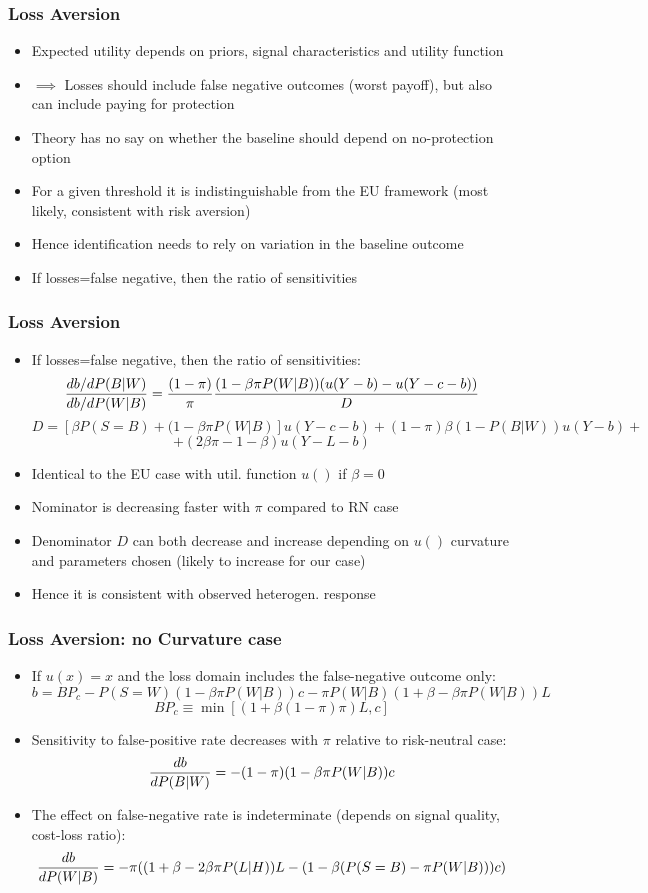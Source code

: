 \documentclass[11pt,hyperref={bookmarks=false}]{beamer}
\begin{document}
\begin{frame}
\frametitle{Loss Aversion}
\begin{itemize}
\item Expected utility depends on priors, signal characteristics and utility function
\item $\implies$ Losses should include false negative outcomes (worst payoff), but also can include paying for protection
\item Theory has no say on whether the baseline should depend on no-protection option
\item For a given threshold it is indistinguishable from the EU framework (most likely, consistent with risk aversion)
\item Hence identification needs to rely on variation in the baseline outcome
\item If losses=false negative, then the ratio of sensitivities
\end{itemize}
\end{frame}





\begin{frame}
\frametitle{Loss Aversion}
\begin{itemize}
\item If losses=false negative, then the ratio of sensitivities:
\footnotesize
$${db/dP(B|W)\over db/dP(W|B)}={(1-\pi)\over \pi}{(1-\beta \pi P(W|B))(u(Y-b)-u(Y-c-b))\over D}$$
$$D=[\beta P(S=B)+(1-\beta \pi P(W|B)]u(Y-c-b)+(1-\pi)\beta(1-P(B|W))u(Y-b)+$$
$$+(2\beta \pi-1-\beta) u(Y-L-b)$$
\normalsize
\item Identical to the EU case with util. function $u()$ if $\beta=0$
\item Nominator is decreasing faster with $\pi$ compared to RN case
\item Denominator $D$ can both decrease and increase depending on $u()$ curvature and parameters chosen (likely to increase for our case)
\item Hence it is consistent with observed heterogen. response
\end{itemize}
\end{frame}


\begin{frame}
\frametitle{Loss Aversion: no Curvature case}
\begin{itemize}
\item If $u(x)=x$ and the loss domain includes the false-negative outcome only:
\small
$$b=BP_c - P(S=W)(1-\beta \pi P(W|B))c-\pi P(W|B)(1+\beta-\beta \pi P(W|B))L$$
$$BP_c \equiv \min[(1+\beta(1-\pi)\pi) L, c]$$
\normalsize
\item Sensitivity to false-positive rate decreases with $\pi$ relative to risk-neutral case:
\small
$${db \over dP(B|W)}=-(1-\pi)(1-\beta \pi P(W|B))c$$
\normalsize
\item The effect on false-negative rate is indeterminate (depends on signal quality, cost-loss ratio):
\small
$${db \over dP(W|B)}=-\pi((1+\beta-2\beta \pi P(L|H))L-(1-\beta(P(S=B)-\pi P(W|B)))c)$$
\normalsize
\end{itemize}
\end{frame}
\end{document}
